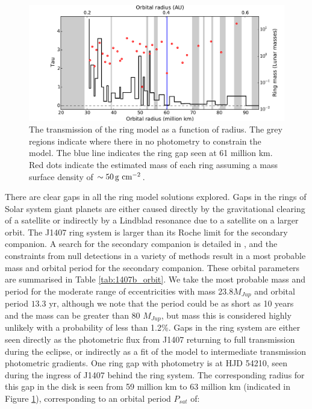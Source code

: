 \documentclass{emulateapj}
\begin{document}
\begin{figure}
\centering
\includegraphics[width=\hsize]{fig6}

\caption{The transmission of the ring model as a function of radius.
The grey regions indicate where there in no photometry to constrain the
model.
The blue line indicates the ring gap seen at 61 million km.
Red dots indicate the estimated mass of each ring assuming a mass
surface density of $\sim 50\, {\rm g}\ {\rm cm}^{-2}$.
\label{fig:tfit}}

\end{figure}

There are clear gaps in all the ring model solutions explored.
Gaps in the rings of Solar system giant planets are either caused
directly by the gravitational clearing of a satellite or indirectly by a
Lindblad resonance due to a satellite on a larger orbit.
The J1407 ring system is larger than its Roche limit for the secondary
companion.
A search for the secondary companion is detailed in \citet{Kenworthy15},
and the constraints from null detections in a variety of methods result
in a most probable mass and orbital period for the secondary companion.
These orbital parameters are summarised in Table \ref{tab:1407b_orbit}.
We take the most probable mass and period for the moderate range of
eccentricities with mass 23.8$M_{Jup}$ and orbital period $13.3$ yr,
although we note that the period could be as short as 10 years and the
mass can be greater than 80 $M_{Jup}$, but mass this is considered highly
unlikely with a probability of less than 1.2\%.
Gaps in the ring system are either seen directly as the photometric flux
from J1407 returning to full transmission during the eclipse, or
indirectly as a fit of the model to intermediate transmission
photometric gradients.
One ring gap with photometry is at HJD 54210, seen during the ingress of
J1407 behind the ring system.
The corresponding radius for this gap in the disk is seen from 59 million km to 63 million km
(indicated in Figure \ref{fig:tfit}), corresponding to an orbital period
$P_{sat}$ of:
\end{document}
